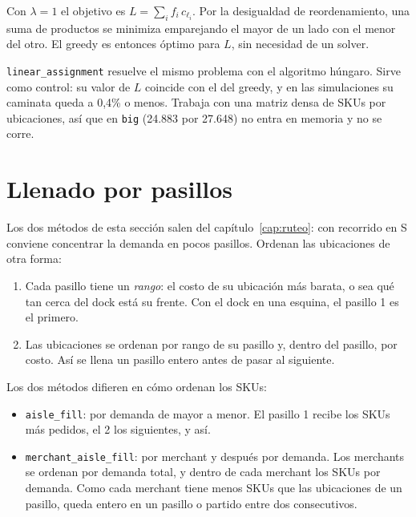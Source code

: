 \documentclass[11pt,a4paper,oneside]{report}
\newcommand{\code}[1]{\texttt{\small #1}}
\begin{document}
\begin{idea}
Con $\lambda = 1$ el objetivo es $L = \sum_i f_i\, c_{\ell_i}$. Por la desigualdad de
reordenamiento, una suma de productos se minimiza emparejando el mayor de un lado con el menor
del otro. El greedy es entonces óptimo para $L$, sin necesidad de un solver.
\end{idea}

\code{linear\_assignment} resuelve el mismo problema con el algoritmo húngaro. Sirve como
control: su valor de $L$ coincide con el del greedy, y en las simulaciones su caminata queda a
0,4\% o menos. Trabaja con una matriz densa de SKUs por ubicaciones, así que en \code{big}
(24.883 por 27.648) no entra en memoria y no se corre.

\section{Llenado por pasillos}
\label{sec:aislefill}

Los dos métodos de esta sección salen del capítulo~\ref{cap:ruteo}: con recorrido en S
conviene concentrar la demanda en pocos pasillos. Ordenan las ubicaciones de otra forma:

\begin{enumerate}
  \item Cada pasillo tiene un \emph{rango}: el costo de su ubicación más barata, o sea qué tan
        cerca del dock está su frente. Con el dock en una esquina, el pasillo 1 es el primero.
  \item Las ubicaciones se ordenan por rango de su pasillo y, dentro del pasillo, por costo.
        Así se llena un pasillo entero antes de pasar al siguiente.
\end{enumerate}

Los dos métodos difieren en cómo ordenan los SKUs:

\begin{itemize}
  \item \code{aisle\_fill}: por demanda de mayor a menor. El pasillo 1 recibe los SKUs más
        pedidos, el 2 los siguientes, y así.
  \item \code{merchant\_aisle\_fill}: por merchant y después por demanda. Los merchants se
        ordenan por demanda total, y dentro de cada merchant los SKUs por demanda. Como cada
        merchant tiene menos SKUs que las ubicaciones de un pasillo, queda entero en un pasillo
        o partido entre dos consecutivos.
\end{itemize}
\end{document}
